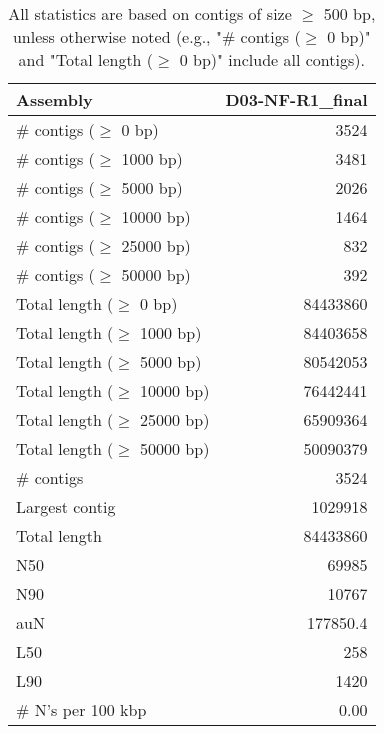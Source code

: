 \documentclass[12pt,a4paper]{article}
\begin{document}
\begin{table}[ht]
\begin{center}
\caption{All statistics are based on contigs of size $\geq$ 500 bp, unless otherwise noted (e.g., "\# contigs ($\geq$ 0 bp)" and "Total length ($\geq$ 0 bp)" include all contigs).}
\begin{tabular}{|l*{1}{|r}|}
\hline
Assembly & D03-NF-R1\_final \\ \hline
\# contigs ($\geq$ 0 bp) & 3524 \\ \hline
\# contigs ($\geq$ 1000 bp) & 3481 \\ \hline
\# contigs ($\geq$ 5000 bp) & 2026 \\ \hline
\# contigs ($\geq$ 10000 bp) & 1464 \\ \hline
\# contigs ($\geq$ 25000 bp) & 832 \\ \hline
\# contigs ($\geq$ 50000 bp) & 392 \\ \hline
Total length ($\geq$ 0 bp) & 84433860 \\ \hline
Total length ($\geq$ 1000 bp) & 84403658 \\ \hline
Total length ($\geq$ 5000 bp) & 80542053 \\ \hline
Total length ($\geq$ 10000 bp) & 76442441 \\ \hline
Total length ($\geq$ 25000 bp) & 65909364 \\ \hline
Total length ($\geq$ 50000 bp) & 50090379 \\ \hline
\# contigs & 3524 \\ \hline
Largest contig & 1029918 \\ \hline
Total length & 84433860 \\ \hline
N50 & 69985 \\ \hline
N90 & 10767 \\ \hline
auN & 177850.4 \\ \hline
L50 & 258 \\ \hline
L90 & 1420 \\ \hline
\# N's per 100 kbp & 0.00 \\ \hline
\end{tabular}
\end{center}
\end{table}
\end{document}
